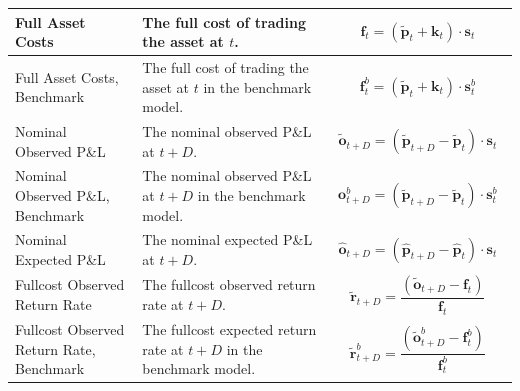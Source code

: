 \documentclass[a4paper,11pt,oneside]{article}
\theoremstyle{plain}
\theoremstyle{definition}
\begin{document}
\begin{longtable}{|p{0.25\linewidth}|p{0.375\linewidth}|p{0.375\linewidth}|}
		{Full Asset Costs}
			&{The full cost of trading the asset at $t$.}
			&{\begin{equation}
				\mathbf{f}_t = (\mathbf{\tilde{p}}_t + \mathbf{k}_t) \cdot \mathbf{s}_t 
				\end{equation}	
			}\\\hline				
		
		{Full Asset Costs, Benchmark}
			&{The full cost of trading the asset at $t$ in the benchmark model.}
			&{\begin{equation}
				\mathbf{f}^b_{t} = (\mathbf{\tilde{p}}_t + \mathbf{k}_t) \cdot \mathbf{s}^b_{t} 
				\end{equation}
			}\\\hline				
		
		
		{Nominal Observed P\&L}
		&{The nominal observed P\&L at $t+D$.}
		&{\begin{equation}
			\mathbf{\tilde{o}}_{t + D} = \left( \mathbf{\tilde{p}}_{t+D} - \mathbf{\tilde{p}}_t \right) \cdot \mathbf{s}_t 
			\end{equation}	
		}\\\hline				
	
		{Nominal Observed P\&L, Benchmark}
			&{The nominal observed P\&L at $t+D$ in the benchmark model.}
			&{\begin{equation}
				\mathbf{o}^b_{t + D} = \left( \mathbf{\tilde{p}}_{t+D} - \mathbf{\tilde{p}}_t \right) \cdot \mathbf{s}^b_{t} 
				\end{equation}
			}\\\hline				
	
			{Nominal Expected P\&L}
			&{The nominal expected P\&L at $t+D$.}
			&{\begin{equation}
				\mathbf{\hat{o}}_{t + D} = \left( \mathbf{\hat{p}}_{t+D} - \mathbf{\hat{p}}_t \right ) \cdot \mathbf{s}_t 
				\end{equation}
			}\\\hline				
		
	
		{Fullcost Observed Return Rate}
		&{The fullcost observed return rate at $t+D$.}
		&{\begin{equation}
			\mathbf{\tilde{r}}_{t + D} = \frac{\left( \mathbf{\tilde{o}}_{t+D} - \mathbf{f}_t \right) }
			{\mathbf{f}_t}
			\end{equation}
		}\\\hline				
		
		{Fullcost Observed Return Rate, Benchmark}
		&{The fullcost expected return rate at $t+D$ in the benchmark model.}
		&{		\begin{equation}
			\mathbf{\tilde{r}}^b_{t + D} = \frac{\left( \mathbf{\tilde{o}}^b_{t+D} - \mathbf{f}^b_t \right) }
			{\mathbf{f}^b_t} 
			\end{equation}	
		}\\\hline	
		

\end{longtable}
\end{document}
